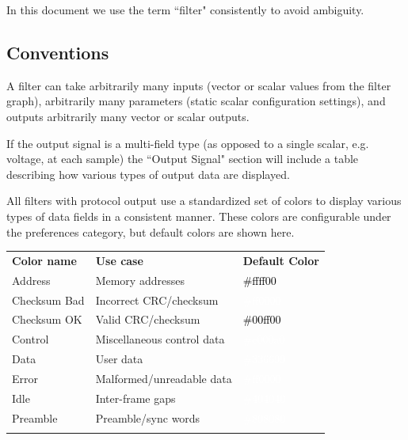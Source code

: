 In this document we use the term ``filter" consistently to avoid ambiguity.

\subsection{Conventions}

A filter can take arbitrarily many inputs (vector or scalar values from the filter graph), arbitrarily many parameters
(static scalar configuration settings), and outputs arbitrarily many vector or scalar outputs.

If the output signal is a multi-field type (as opposed to a single scalar, e.g. voltage, at each sample) the
``Output Signal" section will include a table describing how various types of output data are displayed.

All filters with protocol output use a standardized set of colors to display various types of data fields in a
consistent manner. These colors are configurable under the  preferences category, but
default colors are shown here.

\begin{tabularx}{16cm}{llX}
\thickhline
\textbf{Color name} & \textbf{Use case} & \textbf{Default Color} \\
\thickhline
Address & Memory addresses & \cellcolor{address}\textcolor{black}{\#ffff00} \\
\thinhline
Checksum Bad & Incorrect CRC/checksum & \cellcolor{checksumbad}\textcolor{white}{\#ff0000} \\
\thinhline
Checksum OK & Valid CRC/checksum & \cellcolor{checksumok}\textcolor{black}{\#00ff00} \\
\thinhline
Control & Miscellaneous control data & \cellcolor{control}\textcolor{white}{\#c000a0} \\
\thinhline
Data & User data & \cellcolor{data}\textcolor{white}{\#336699} \\
\thinhline
Error & Malformed/unreadable data & \cellcolor{error}\textcolor{white}{\#ff0000} \\
\thinhline
Idle & Inter-frame gaps & \cellcolor{idle}\textcolor{white}{\#404040} \\
\thinhline
Preamble & Preamble/sync words & \cellcolor{preamble}\textcolor{white}{\#808080} \\
\thickhline
\end{tabularx}

\pagebreak
